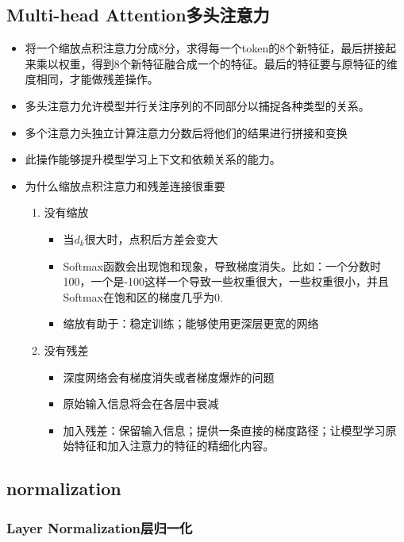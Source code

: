 \documentclass[UTF8]{ctexart}
\begin{document}
\subsection{Multi-head Attention多头注意力}
\begin{itemize}
    \item 将一个缩放点积注意力分成8分，求得每一个token的8个新特征，最后拼接起来乘以权重，得到8个新特征融合成一个的特征。最后的特征要与原特征的维度相同，才能做残差操作。
    \item 多头注意力允许模型并行关注序列的不同部分以捕捉各种类型的关系。
    \item 多个注意力头独立计算注意力分数后将他们的结果进行拼接和变换
    \item 此操作能够提升模型学习上下文和依赖关系的能力。
    
    \item 为什么缩放点积注意力和残差连接很重要
    \begin{enumerate}
        \item 没有缩放
        \begin{itemize}
            \item 当$d_{k}$很大时，点积后方差会变大
            \item Softmax函数会出现饱和现象，导致梯度消失。比如：一个分数时100，一个是-100这样一个导致一些权重很大，一些权重很小，并且Softmax在饱和区的梯度几乎为0.
            \item 缩放有助于：稳定训练；能够使用更深层更宽的网络
        \end{itemize}
        \item 没有残差
        \begin{itemize}
            \item 深度网络会有梯度消失或者梯度爆炸的问题
            \item 原始输入信息将会在各层中衰减
            \item 加入残差：保留输入信息；提供一条直接的梯度路径；让模型学习原始特征和加入注意力的特征的精细化内容。
        \end{itemize}
    \end{enumerate}
\end{itemize}

\subsection{normalization}

\subsubsection{Layer Normalization层归一化}
\end{document}

